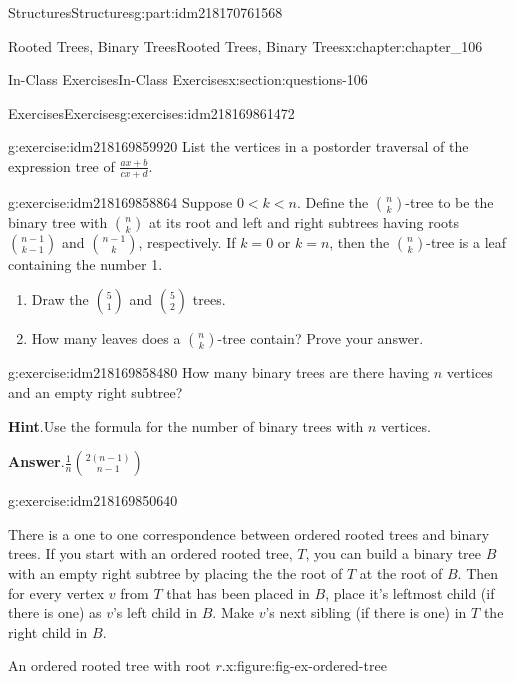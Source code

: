 \documentclass[oneside,10pt,]{book}
\newcommand{\blocktitlefont}{\relax}
\numberwithin{equation}{section}
\newcommand{\lt}{<}
\begin{document}
\begin{partptx}{Structures}{}{Structures}{}{}{g:part:idm218170761568}
\begin{chapterptx}{Rooted Trees, Binary Trees}{}{Rooted Trees, Binary Trees}{}{}{x:chapter:chapter_106}
\begin{sectionptx}{In-Class Exercises}{}{In-Class Exercises}{}{}{x:section:questions-106}
\begin{exercises-subsection-numberless}{Exercises}{}{Exercises}{}{}{g:exercises:idm218169861472}
\begin{exercisegroup}
\begin{divisionexerciseeg}{2}{}{}{g:exercise:idm218169859920}
List the vertices in a postorder traversal of the  expression tree of \(\frac{a x + b}{c x + d}\).%
\end{divisionexerciseeg}%
\begin{divisionexerciseeg}{3}{}{}{g:exercise:idm218169858864}%
Suppose \(0 \lt k \lt n\). Define the \(\binom{n}{k}\)-tree to be the binary tree with \(\binom{n}{k}\) at its root and left and right subtrees having roots \(\binom{n-1}{k-1}\) and \(\binom{n-1}{k}\), respectively. If \(k=0\) or \(k=n\), then the \(\binom{n}{k}\)-tree is a leaf containing the number 1.%
\begin{enumerate}[label=(\alph*)]
\item{}Draw the \(\binom{5}{1}\) and \(\binom{5}{2}\) trees.%
\item{}How many leaves does a \(\binom{n}{k}\)-tree contain?  Prove your answer.%
\end{enumerate}
%
\end{divisionexerciseeg}%
\begin{divisionexerciseeg}{4}{}{}{g:exercise:idm218169858480}%
How many binary trees are there having \(n\) vertices and an empty right subtree?%
\par\smallskip%
\noindent\textbf{\blocktitlefont Hint}.\hypertarget{g:hint:idm218169851152}{}\quad{}Use the formula for the number of binary trees with \(n\) vertices.%
\par\smallskip%
\noindent\textbf{\blocktitlefont Answer}.\hypertarget{g:answer:idm218169850224}{}\quad{}\(\frac{1}{n} \binom{2(n-1)}{n-1}\)%
\end{divisionexerciseeg}%
\begin{divisionexerciseeg}{5}{}{}{g:exercise:idm218169850640}%
\begin{sidebyside}{2}{0}{0}{0}%
\begin{sbspanel}{0.5}%
There is a one to one correspondence between ordered rooted trees and binary trees.  If you start with an ordered rooted tree, \(T\), you can build a binary tree \(B\) with an empty right subtree by placing the the root of \(T\) at the root of \(B\).  Then for every vertex \(v\) from \(T\) that has been placed in \(B\), place it's leftmost child (if there is one) as \(v\)'s left child in \(B\). Make \(v\)'s next sibling (if there is one) in \(T\) the right child in \(B\).%
\end{sbspanel}%
\begin{sbspanel}{0.5}%
\begin{figureptx}{An ordered rooted tree with root \(r\).}{x:figure:fig-ex-ordered-tree}{}%

\end{figureptx}
\end{sbspanel}
\end{sidebyside}
\end{divisionexerciseeg}
\end{exercisegroup}
\end{exercises-subsection-numberless}
\end{sectionptx}
\end{chapterptx}
\end{partptx}
\end{document}
